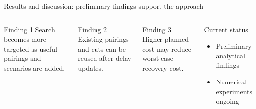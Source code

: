 \documentclass[aspectratio=169,11pt]{beamer}
\newenvironment{compactitem}{%
  \begin{itemize}
  \setlength{\itemsep}{1pt}
  \setlength{\parskip}{0pt}
}{\end{itemize}}
\begin{document}
\begin{frame}{Results and discussion: preliminary findings support the approach}
  \begin{columns}[T,onlytextwidth]
      \begin{exampleblock}{Finding 1}
        Search becomes more targeted as useful pairings and scenarios are added.
      \end{exampleblock}

      \begin{exampleblock}{Finding 2}
        Existing pairings and cuts can be reused after delay updates.
      \end{exampleblock}

      \begin{exampleblock}{Finding 3}
        Higher planned cost may reduce worst-case recovery cost.
      \end{exampleblock}

      \begin{alertblock}{Current status}
        \begin{compactitem}
          \item Preliminary analytical findings
          \item Numerical experiments ongoing
        \end{compactitem}
      \end{alertblock}
  \end{columns}
\end{frame}
\end{document}
